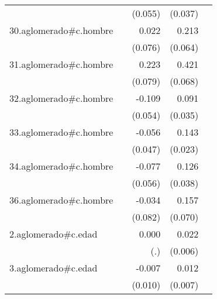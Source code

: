 {\begin{longtable}{l*{4}{D{.}{.}{-1}}}
            &                     &     (0.055)         &     (0.037)         &                     \\
\addlinespace
30.aglomerado#c.hombre&                     &       0.022         &       0.213\sym{***}&                     \\
            &                     &     (0.076)         &     (0.064)         &                     \\
\addlinespace
31.aglomerado#c.hombre&                     &       0.223\sym{**} &       0.421\sym{***}&                     \\
            &                     &     (0.079)         &     (0.068)         &                     \\
\addlinespace
32.aglomerado#c.hombre&                     &      -0.109\sym{*}  &       0.091\sym{**} &                     \\
            &                     &     (0.054)         &     (0.035)         &                     \\
\addlinespace
33.aglomerado#c.hombre&                     &      -0.056         &       0.143\sym{***}&                     \\
            &                     &     (0.047)         &     (0.023)         &                     \\
\addlinespace
34.aglomerado#c.hombre&                     &      -0.077         &       0.126\sym{***}&                     \\
            &                     &     (0.056)         &     (0.038)         &                     \\
\addlinespace
36.aglomerado#c.hombre&                     &      -0.034         &       0.157\sym{*}  &                     \\
            &                     &     (0.082)         &     (0.070)         &                     \\
\addlinespace
2.aglomerado#c.edad&                     &       0.000         &       0.022\sym{***}&                     \\
            &                     &         (.)         &     (0.006)         &                     \\
\addlinespace
3.aglomerado#c.edad&                     &      -0.007         &       0.012         &                     \\
            &                     &     (0.010)         &     (0.007)         &                     \\

\end{longtable}}
